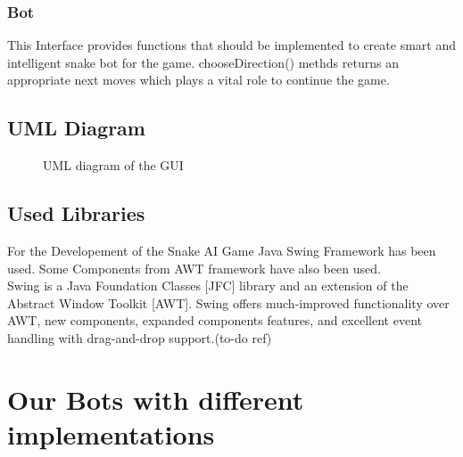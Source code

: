 \documentclass[a4paper,12pt]{article}
\begin{document}
\subsubsection{Bot}
This Interface provides functions that should be implemented to create smart and intelligent snake bot for the game. chooseDirection() methds returns an appropriate next moves which plays a vital role to continue the game. 

\subsection{UML Diagram}

\begin{figure}[h]
\centering
\caption{UML diagram of the GUI}
\end{figure}

\subsection{Used Libraries}
For the Developement of the Snake AI Game Java Swing Framework has been used.
Some Components from AWT framework have also been used.\\ 
Swing is a Java Foundation Classes [JFC] library and an extension of the Abstract Window Toolkit [AWT]. Swing offers much-improved functionality over AWT, new components, expanded components features, and excellent event handling with drag-and-drop support.(to-do ref)
 
\section{Our Bots with different implementations}
\end{document}

